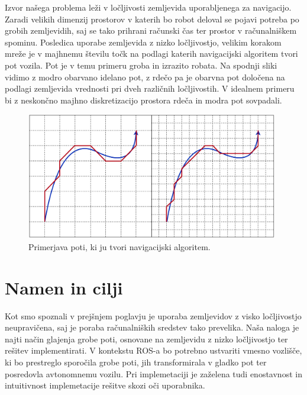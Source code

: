 \documentclass[10pt,a4paper]{article}
\begin{document}
Izvor našega problema leži v ločljivosti zemljevida uporabljenega za navigacijo. Zaradi velikih dimenzij prostorov v katerih bo robot deloval se pojavi potreba po grobih zemljevidih, saj se tako prihrani računski čas ter prostor v računalniškem spominu. Posledica uporabe zemljevida z nizko ločljivostjo, velikim korakom mreže je v majhnemu številu točk na podlagi katerih navigacijski algoritem tvori pot vozila. Pot je v temu primeru groba in izrazito robata. Na spodnji sliki vidimo z modro obarvano idelano pot, z rdečo pa je obarvna pot določena na podlagi zemljevida vrednosti pri dveh različnih ločljivostih. V idealnem primeru bi z neskončno majhno diskretizacijo prostora rdeča in modra pot sovpadali.

\begin{figure}[H]
	\centering
	\includegraphics[width=11cm]{pic/pot.png}
	\caption{Primerjava poti, ki ju tvori navigacijski algoritem.}
	\label{fig:slika}
\end{figure}

\section{Namen in cilji}

Kot smo spoznali v prejšnjem poglavju je uporaba zemljevidov z visko ločljivostjo neupravičena, saj je poraba računalniških sredstev tako prevelika. Naša naloga je najti način glajenja grobe poti, osnovane na zemljevidu z nizko ločljivostjo ter rešitev implementirati. V kontekstu ROS-a bo potrebno ustvariti vmesno vozlišče, ki bo prestreglo sporočila grobe poti, jih transformirala v gladko pot ter posredovla avtonomnemu vozilu. Pri implemetaciji je zaželena tudi enostavnost in intuitivnost implemetacije rešitve skozi oči uporabnika.
\end{document}
